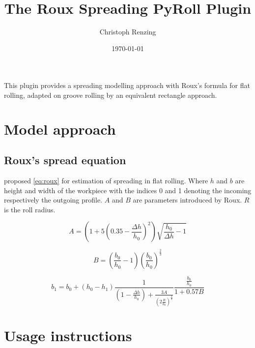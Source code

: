 \documentclass[11pt]{PyRollDocs}
\begin{document}
    \title{The Roux Spreading PyRoll Plugin}
    \author{Christoph Renzing}
    \date{\today}

    \maketitle

    This plugin provides a spreading modelling approach with Roux's formula for flat rolling, adapted on groove rolling by an equivalent rectangle approach.

    \section{Model approach}\label{sec:model-approach}

    \subsection{Roux's spread equation}\label{subsec:roux's-spread-equation}

    \textcite{Roux1939} proposed \autoref{eq:roux} for estimation of spreading in flat rolling.
    Where $h$ and $b$ are height and width of the workpiece with the indices 0 and 1 denoting the incoming respectively the outgoing profile.
    $A$ and $B$ are parameters introduced by Roux.
    $R$ is the roll radius.


    \begin{equation}
        A = \left( 1 + 5 \left( 0.35 - \frac{\Delta h}{h_0}\right)^2 \right) \sqrt{\frac{h_0}{\Delta h} - 1}
        \label{eq:roux-parameter-a}
    \end{equation}

    \begin{equation}
        B = \left( \frac{b_0}{h_0} - 1 \right) \left( \frac{b_0}{h_0} \right)^{\frac{2}{3}}
        \label{eq:roux-parameter-b}
    \end{equation}

    \begin{equation}
        b_1 = b_0 + \left( h_0 - h_1 \right) \frac{1}{\left( 1 - \frac{\Delta h}{h_0} \right) + \frac{3 A}{\left( 2 \frac{R}{h_0} \right)^{\frac{3}{4}}}} \frac{\frac{b_0}{h_0}}{1 + 0.57 B}
        \label{eq:roux}
    \end{equation}

    \section{Usage instructions}\label{sec:usage-instructions}
\end{document}
